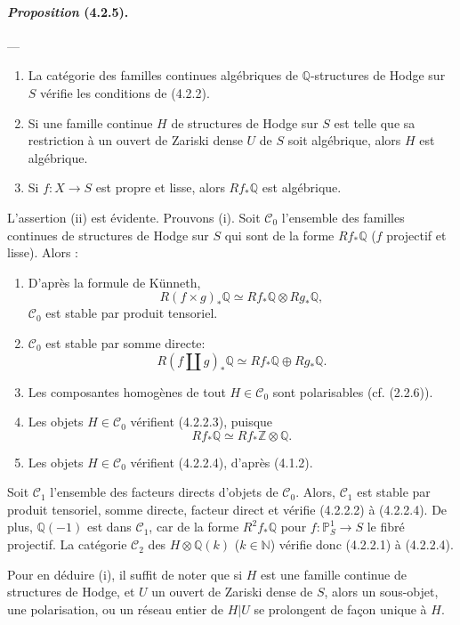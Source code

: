 \documentclass[10pt]{article}
\newcommand{\Q}{\mathbb Q}
\newcommand{\Z}{\mathbb Z}
\newcommand{\N}{\mathbb N}
\newcommand{\bbP}{\mathbb P}
\begin{document}
\paragraph{\emph{Proposition} (4.2.5).} --- {\itshape
\begin{enumerate}[label=(\roman*)]
\item La catégorie des familles continues algébriques de $\Q$-structures de Hodge sur $S$ vérifie les conditions de (4.2.2).
\item Si une famille continue $H$ de structures de Hodge sur $S$ est telle que sa restriction à un ouvert de Zariski dense $U$ de $S$ soit algébrique, alors $H$ est algébrique.
\item Si $f:X\to S$ est propre et lisse, alors $Rf_*\Q$ est algébrique.
\end{enumerate}}

L'assertion (ii) est évidente. Prouvons (i). Soit $\mathcal C_0$ l'ensemble des familles continues de structures de Hodge sur $S$ qui sont de la forme $Rf_*\Q$ ($f$ projectif et lisse). Alors :
\begin{enumerate}[label=\alph*)]
\item D'après la formule de Künneth,
\[
R(f\times g)_*\Q\simeq Rf_*\Q\otimes Rg_*\Q,
\]
$\mathcal C_0$ est stable par produit tensoriel.
\item $\mathcal C_0$ est stable par somme directe:
\[
R(f\amalg g)_*\Q\simeq Rf_*\Q\oplus Rg_*\Q.
\]
\end{enumerate}



\begin{enumerate}[label=\alph*)]
\setcounter{enumi}{2}
\item Les composantes homogènes de tout $H\in\mathcal C_0$ sont polarisables (cf. (2.2.6)).
\item Les objets $H\in\mathcal C_0$ vérifient (4.2.2.3), puisque
\[
Rf_*\Q\simeq Rf_*\Z\otimes\Q.
\]
\item Les objets $H\in\mathcal C_0$ vérifient (4.2.2.4), d'après (4.1.2).
\end{enumerate}
Soit $\mathcal C_1$ l'ensemble des facteurs directs d'objets de $\mathcal C_0$. Alors, $\mathcal C_1$ est stable par produit tensoriel, somme directe, facteur direct et vérifie (4.2.2.2) à (4.2.2.4). De plus, $\Q(-1)$ est dans $\mathcal C_1$, car de la forme $R^2f_*\Q$ pour $f:\bbP^1_S\to S$ le fibré projectif. La catégorie $\mathcal C_2$ des $H\otimes\Q(k)$ ($k\in\N$) vérifie donc (4.2.2.1) à (4.2.2.4).

Pour en déduire (i), il suffit de noter que si $H$ est une famille continue de structures de Hodge, et $U$ un ouvert de Zariski dense de $S$, alors un sous-objet, une polarisation, ou un réseau entier de $H|U$ se prolongent de façon unique à $H$.
\end{document}
